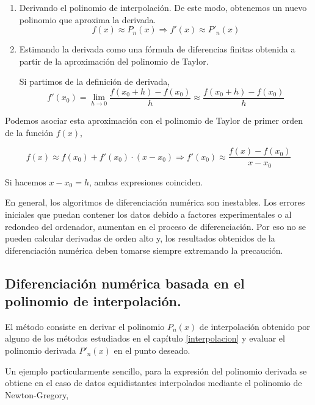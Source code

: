 \begin{enumerate}
\item Derivando el polinomio de interpolación. De este modo, obtenemos un nuevo polinomio que aproxima la derivada.
\begin{equation*}
f(x)\approx P_n(x) \Rightarrow f'(x) \approx P'_n(x)
\end{equation*}

\item Estimando la derivada como una fórmula de diferencias finitas obtenida a partir de la aproximación del polinomio de Taylor. 

Si partimos de la definición de derivada, 
\begin{equation*}
f'(x_0)=\lim_{h\rightarrow 0}\frac{f(x_0+h)-f(x_0)}{h} \approx \frac{f(x_0+h)-f(x_0)}{h} 
\end{equation*}
\end{enumerate}

Podemos asociar esta aproximación con el polinomio de Taylor de primer orden de la función $f(x)$,

\begin{equation*}
f(x)\approx f(x_0)+f'(x_0)\cdot(x-x_0) \Rightarrow f'(x_0)\approx \frac{f(x)-f(x_0)}{x-x_0}
\end{equation*}

Si hacemos $x-x_0=h$, ambas expresiones coinciden.
 
En general, los algoritmos de diferenciación numérica son inestables. Los errores iniciales que puedan contener los datos debido a factores experimentales o al redondeo del ordenador, aumentan en el proceso de diferenciación. Por eso no se pueden calcular derivadas de orden alto y, los resultados obtenidos de la diferenciación numérica deben tomarse siempre extremando la precaución.

\subsection{Diferenciación numérica basada en el polinomio de interpolación.}

El método consiste en derivar el polinomio $P_n(x)$ de interpolación obtenido por alguno de los métodos estudiados en el capítulo \ref{interpolacion} y evaluar el polinomio derivada $P'_n(x)$ en el punto deseado.

Un ejemplo particularmente sencillo, para la expresión del polinomio derivada se obtiene  en el caso de datos equidistantes interpolados mediante el polinomio de Newton-Gregory,


